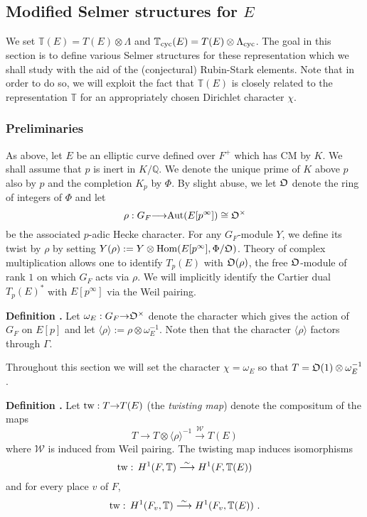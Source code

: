 \documentclass[12pt]{amsart}
\numberwithin{equation}{section}
\newenvironment{define}{\par\medskip\noindent\refstepcounter{thm}
\bgroup{\hspace*{-0.15 cm}\bf{Definition}
\thethm.}\bgroup}{\egroup \egroup\par\medskip}
\begin{document}
\subsection{Modified Selmer structures for $E$}
\label{subsec:modifiedselmerE}
We set ${\mathbb{T}}(E)=T(E)\otimes{\Lambda}$ and ${\mathbb{T}}_{\textup{cyc}}(E)=T(E)\otimes{\Lambda}_{\textup{cyc}}$. The goal in this section is to define various Selmer structures for these representation which we shall study with the aid of the (conjectural) Rubin-Stark elements. Note that in order to do so, we will exploit the fact that ${\mathbb{T}}(E)$ is closely related to the representation ${\mathbb{T}}$ for an appropriately chosen Dirichlet character $\chi$.
\subsubsection{Preliminaries}
\label{subsubsec:prelim}
As above, let $E$ be an elliptic curve defined over $F^+$ which has CM by $K$. We shall assume that $p$ is inert in $K/{\mathbb{Q}}$. We denote the unique prime of $K$ above $p$ also by $p$ and the completion $K_p$ by $\Phi$. By slight abuse, we let $\frak{O}$ denote the ring of integers of $\Phi$ and let
$$\rho: G_F{\longrightarrow} \textup{Aut}(E[p^\infty])\cong\frak{O}^\times$$
be the associated $p$-adic Hecke character. For any $G_F$-module $Y$, we define its twist by $\rho$ by setting $Y(\rho):= Y\otimes\textup{Hom}(E[p^\infty],\Phi/{\frak{O}})$. Theory of complex multiplication allows one to identify $T_p(E)$ with ${\frak{O}}(\rho)$, the free ${\frak{O}}$-module of rank $1$ on which $G_F$ acts via $\rho$. We will implicitly identify the Cartier dual $T_p(E)^*$ with $E[p^\infty]$ via the Weil pairing.  
\begin{define}
\label{def:modpGalrepofE}
Let $\omega_E:G_F{\rightarrow} {\frak{O}}^\times$ denote the character which gives the action of $G_F$ on $E[p]$ and let $\langle\rho\rangle:=\rho\otimes\omega^{-1}_E$. Note then that the character $\langle\rho\rangle$ factors through $\Gamma$. 
\end{define}
Throughout this section we will set the character $\chi=\omega_E$ so that $T={\frak{O}}(1)\otimes \omega_E^{-1}$.
\begin{define}
Let $\textup{tw}: T {\rightarrow} T(E)$ (the \emph{twisting map}) denote the compositum of the maps
$$T{\longrightarrow} T\otimes \langle\rho\rangle^{-1} \stackrel{\mathcal{W}}{\longrightarrow} T(E)$$
where $\mathcal{W}$ is induced from Weil pairing. The twisting map induces isomorphisms
$$\textup{tw}:\,H^1(F,{\mathbb{T}})\stackrel{\sim}{\longrightarrow} H^1(F,{\mathbb{T}}(E))$$
and for every place $v$ of $F$,
$$\textup{tw}:\,H^1(F_v,{\mathbb{T}})\stackrel{\sim}{\longrightarrow} H^1(F_v,{\mathbb{T}}(E))\,\,.$$
\end{define}
\end{document}
